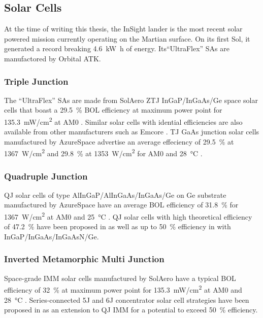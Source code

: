 \subsection{Solar Cells}
At the time of writing this thesis, the InSight lander is the most recent solar powered mission currently operating on the Martian surface. On its first Sol, it generated a record breaking \SI{4.6}{\kilo\watt\hour} of energy. Its``UltraFlex'' \acp{SA} are manufactored by Orbital ATK.

\subsubsection{Triple Junction}
The ``UltraFlex'' \acp{SA} are made from SolAero \ac{ZTJ} \ac{InGaP}/\ac{InGaAs}/\ac{Ge} space solar cells that boast a \SI{29.5}{\percent} \ac{BOL} efficiency at maximum power point for \SI{135.3}{\milli\watt/\centi\meter^{2}} at \ac{AM0} . Similar solar cells with idential efficiencies are also available from other manufacturers such as Emcore . \ac{TJ} \ac{GaAs} junction solar cells manufactured by AzureSpace advertise an average effeciency of \SI{29.5}{\percent} at \SI{1367}{\watt/\centi\meter^{2}} and \SI{29.8}{\percent} at \SI{1353}{\watt/\centi\meter^{2}} for \ac{AM0} and \SI{28}{\celsius} .

\subsubsection{Quadruple Junction}
\ac{QJ} solar cells of type \ac{AlInGaP}/\ac{AlInGaAs}/\ac{InGaAs}/\ac{Ge} on \ac{Ge} substrate manufactured by AzureSpace have an average \ac{BOL} efficiency of \SI{31.8}{\percent} for \SI{1367}{\watt/\centi\meter^{2}} at \ac{AM0} and \SI{25}{\celsius} . \ac{QJ} solar cells with high theoretical efficiency of \SI{47.2}{\percent} have been proposed in  as well as up to \SI{50}{\percent} efficiency in  with \ac{InGaP}/\ac{InGaAs}/\ac{InGaAsN}/\ac{Ge}.

\subsubsection{Inverted Metamorphic Multi Junction}
Space-grade \ac{IMM} solar cells manufactured by SolAero have a typical \ac{BOL} efficiency of \SI{32}{\percent} at maximum power point for \SI{135.3}{\milli\watt/\centi\meter^{2}} at \ac{AM0} and \SI{28}{\celsius} . Series-connected \ac{5J} and \ac{6J} concentrator solar cell strategies have been proposed in  as an extension to \ac{QJ} \ac{IMM} for a potential to exceed \SI{50}{\percent} efficiency.

